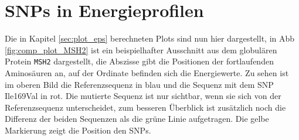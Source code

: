 \section{SNPs in Energieprofilen}

Die in Kapitel \ref{sec:plot_eps} berechneten Plots sind nun hier dargestellt, in \ac{Abb} \ref{fig:comp_plot_MSH2} ist ein beispielhafter Ausschnitt aus dem globulären Protein \texttt{MSH2} dargestellt, die Abszisse gibt die Positionen der fortlaufenden Aminosäuren an, auf der Ordinate befinden sich die Energiewerte. Zu sehen ist im oberen Bild die Referenzsequenz in blau und die Sequenz mit dem \ac{SNP} Ile169Val in rot. Die mutierte Sequenz ist nur sichtbar, wenn sie sich von der Referenzsequenz unterscheidet, zum besseren Überblick ist zusätzlich noch die Differenz der beiden Sequenzen als die grüne Linie aufgetragen. Die gelbe Markierung zeigt die Position den \ac{SNP}s. 

